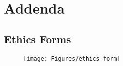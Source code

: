 \chapter{Addenda}


\section{Ethics Forms}
\begin{figure}[ht!]
	\texttt{[image: Figures/ethics-form]}
\end{figure}